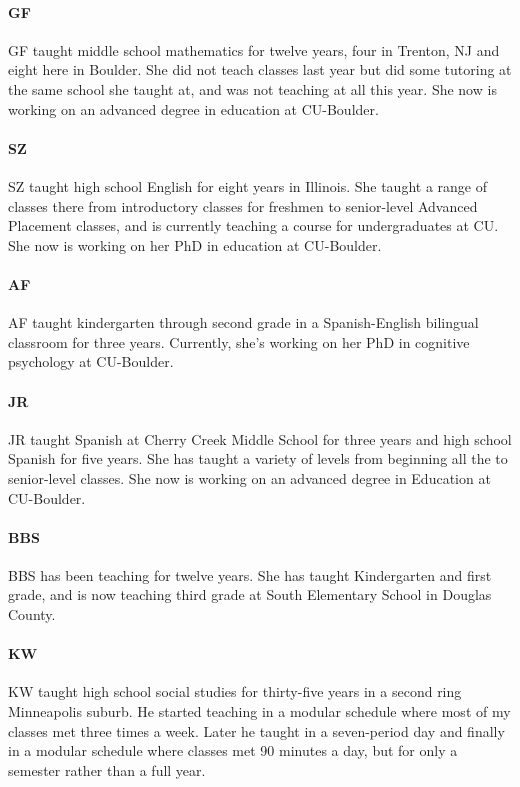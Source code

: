 \paragraph{GF} GF taught middle school mathematics for twelve years, four in Trenton, NJ
and eight here in Boulder.  She did not teach classes last year but did some
tutoring at the same school she taught at, and was not teaching at all this
year. She now is working on an advanced degree in education at CU-Boulder.

\paragraph{SZ} SZ taught high school English for eight years in Illinois.  She
taught a range of classes there from introductory classes for freshmen to
senior-level Advanced Placement classes, and is currently teaching a course for
undergraduates at CU.  She now is working on her PhD in education at CU-Boulder.

\paragraph{AF} AF taught kindergarten through second grade in a Spanish-English
bilingual classroom for three years.  Currently, she's working on her PhD in
cognitive psychology at CU-Boulder.

\paragraph{JR} JR taught Spanish at Cherry Creek Middle School for three years
and high school Spanish for five years. She has taught a variety of levels from
beginning all the to senior-level classes. She now is working on an advanced
degree in Education at CU-Boulder.

\paragraph{BBS} BBS has been teaching for twelve years. She has taught Kindergarten
and first grade, and is now teaching third grade at South Elementary
School in Douglas County.

\paragraph{KW} KW taught high school social studies for thirty-five years in a second
ring Minneapolis suburb. He started teaching in a modular schedule where most of
my classes met three times a week. Later he taught in a seven-period day and finally in
a modular schedule where classes met 90 minutes a day, but for only a semester
rather than a full year.

